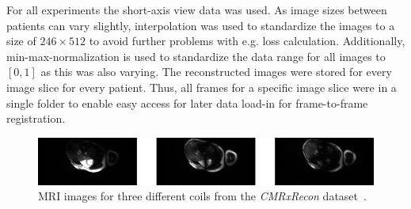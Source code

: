 For all experiments the short-axis  view data was used. As image sizes between patients can vary slightly, interpolation was used to standardize the images to a size of $246 \times 512$ to avoid further problems with e.g. 
loss calculation. Additionally, min-max-normalization is used to standardize the data range for all images to $[0,1]$ as this was also varying. The reconstructed images were stored for every image slice for every patient. Thus, all frames for a specific image slice were in a single folder to enable easy access for later data load-in for frame-to-frame registration.

\begin{figure}[h]%
	\centering
	\graphicspath{{images/}{\main/images/}}
	\includegraphics[width=\linewidth]{CoilsHorizontal.png} 
	\caption{MRI images for three different coils from the \emph{CMRxRecon} dataset~\cite{CMRxRecon}.}
	\label{fig:Coils}
\end{figure}


